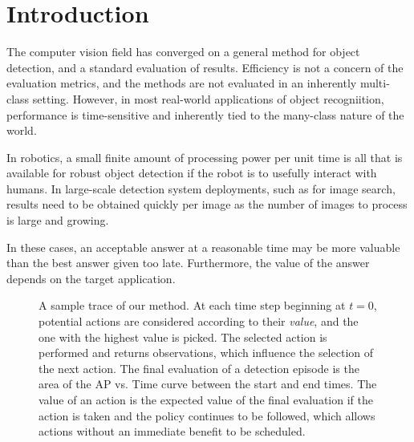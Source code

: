 \section{Introduction}

The computer vision field has converged on a general method for object detection, and a standard evaluation of results.
Efficiency is not a concern of the evaluation metrics, and the methods are not evaluated in an inherently multi-class setting.
However, in most real-world applications of object recogniition, performance is time-sensitive and inherently tied to the many-class nature of the world.

In robotics, a small finite amount of processing power per unit time is all that is available for robust object detection if the robot is to usefully interact with humans.
In large-scale detection system deployments, such as for image search, results need to be obtained quickly per image as the number of images to process is large and growing.

In these cases, an acceptable answer at a reasonable time may be more valuable than the best answer given too late.
Furthermore, the value of the answer depends on the target application.

\begin{figure}[ht!]
  \caption{
A sample trace of our method.
At each time step beginning at $t=0$, potential actions are considered according to their \emph{value}, and the one with the highest value is picked.
The selected action is performed and returns observations, which influence the selection of the next action.
The final evaluation of a detection episode is the area of the AP vs. Time curve between the start and end times.
The value of an action is the expected value of the final evaluation if the action is taken and the policy continues to be followed, which allows actions without an immediate benefit to be scheduled.
}
  \label{fig:figure1}
\end{figure}

